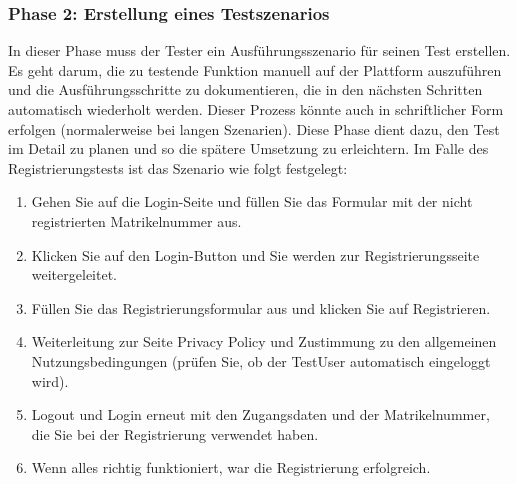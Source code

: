 \subsubsection{Phase 2: Erstellung eines Testszenarios}

In dieser Phase muss der Tester ein Ausführungsszenario für seinen 
Test erstellen. Es geht darum, die zu testende Funktion manuell
auf der Plattform auszuführen und die Ausführungsschritte zu 
dokumentieren, die in den nächsten Schritten automatisch wiederholt
werden. Dieser Prozess könnte auch in schriftlicher Form erfolgen
(normalerweise bei langen Szenarien). Diese Phase dient dazu, den 
Test im Detail zu planen und so die spätere Umsetzung zu erleichtern.
Im Falle des Registrierungstests ist das Szenario wie folgt festgelegt:

\begin{enumerate}
    \item Gehen Sie auf die Login-Seite und füllen Sie das Formular mit
    der nicht registrierten Matrikelnummer aus.
    \item Klicken Sie auf den Login-Button und Sie werden zur
    Registrierungsseite weitergeleitet.
    \item Füllen Sie das Registrierungsformular aus und klicken Sie
    auf Registrieren.
    \item Weiterleitung zur Seite Privacy Policy und Zustimmung zu
    den allgemeinen Nutzungsbedingungen
    (prüfen Sie, ob der TestUser automatisch eingeloggt wird).
    \item Logout und Login erneut mit den Zugangsdaten und der
    Matrikelnummer, die Sie bei der Registrierung verwendet haben.
    \item Wenn alles richtig funktioniert, war die Registrierung erfolgreich.
\end{enumerate}